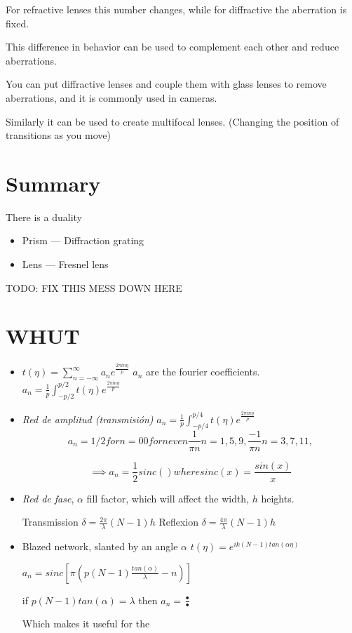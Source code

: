 \documentclass[../main/main.tex]{subfiles}
\begin{document}
For refractive lenses this number changes, while for diffractive the aberration is fixed.

This difference in behavior can be used to complement each other and reduce aberrations.

You can put diffractive lenses and couple them with glass lenses to remove aberrations, and it is commonly used in cameras.

Similarly it can be used to create multifocal lenses. (Changing the position of transitions as you move)
\section{Summary}

There is a duality

\begin{itemize}
	\item Prism --- Diffraction grating
	\item Lens --- Fresnel lens

\end{itemize}



TODO: FIX THIS MESS DOWN HERE
\section{WHUT}
\begin{itemize}
	\item $t(\eta) = \sum_{n=-\infty}^{\infty} a_{n}e^{\frac{2\pi i n \eta}{p}}$
	$a_{n}$ are the fourier coefficients. $a_{n} = \frac{1}{p}\int_{-p/2}^{p/2} t(\eta)e^{\frac{2\pi i n \eta}{p}}$
	\item \emph{Red de amplitud (transmisión)} $a_{n} =  \frac{1}{p}\int_{-p/4}^{p/4} t(\eta)e^{\frac{2\pi i n \eta}{p}}$
	\begin{equation}
	a_{n} = 1/2 for n = 0
	0 for n even
	\frac{1}{\pi n} n = 1, 5, 9,
	\frac{-1}{\pi n} n = 3, 7, 11,
	\end{equation}

	\begin{equation}
	\implies a_{n} = \frac{1}{2} sinc()   where sinc(x) = \frac{sin(x)}{x}
	\end{equation}

	\item \emph{Red de fase}, $\alpha$ fill factor, which will affect the width, $h$ heights.

	Transmission $\delta =  \frac{2 \pi }{\lambda} (N-1)h$
	Reflexion $\delta =  \frac{4 \pi }{\lambda} (N-1)h$
	\item Blazed network, slanted by an angle $\alpha$
	$t(\eta) = e^{i k (N-1) tan (\alpha \eta)}$

	$a_{n} = sinc\left[\pi \left(p (N-1) \frac{tan (\alpha)}{\lambda} - n\right)\right]$

	if $p(N-1) tan(\alpha) = \lambda$ then $a_{n} = \frac{•}{•}$

	Which makes it useful for the

\end{itemize}
\end{document}

